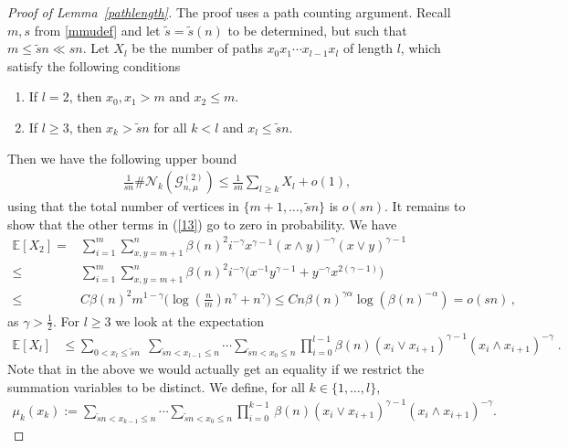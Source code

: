 \documentclass[10pt,a4paper]{amsart}
\begin{document}
\begin{proof}[Proof of Lemma~\ref{pathlength}]
The proof uses a path counting argument. Recall $m, s$ from \eqref{mmudef} %
and let $\tilde s=\tilde s(n)$ to be determined, but such that $m \le \tilde sn \ll sn $.
Let $X_l$ be the number of paths $x_0x_1\cdots x_{l-1}x_l$ of length $l$, which satisfy the following conditions 
\begin{enumerate}
    \item[(a)] If $l=2$, then $x_0,x_1>m$ and $x_2 \le m$.
    \item[(b)] If $l\ge 3$, then $x_k>\tilde sn$ for all $k<l$ and $x_l\le \tilde sn$. 
\end{enumerate}
Then we have the following upper bound 
\begin{align} \label{13}
   \frac{1}{sn}\#\mathcal{N}_k(\mathcal G_{n,\mu}^{(2)}) \le    \frac{1}{sn}\sum_{l\ge k} X_l + o(1),
\end{align}
using that the total number of vertices in $\{m+1,\ldots, \tilde{s}n\}$ is $o(sn)$.
It remains to show that the other terms in (\ref{13}) go to zero in probability. We have
\begin{align*}
    \mathbb{E}[X_2]=&\sum_{i=1}^m \sum_{x,y=m+1}^n \beta(n)^2 i^{-\gamma}x^{\gamma-1}(x\wedge y)^{-\gamma}(x\vee y)^{\gamma-1}
    \\ \le & \sum_{i=1}^m \sum_{x,y=m+1}^n \beta(n)^2 i^{-\gamma}\big(x^{-1}y^{\gamma-1}+y^{-\gamma}x^{2(\gamma-1)}\big)
   \\ \le &  C\beta(n)^2 m^{1-\gamma}\big(\log(\tfrac{n}{m})n^{\gamma}+n^{\gamma}\big)
    \le   C n \beta(n)^{\gamma\alpha}\log(\beta(n)^{-\alpha}) = o(sn)\,,
\end{align*}
as $\gamma>\tfrac12$. 
For $l\ge 3$ we look at the expectation
\begin{align*}
	     \mathbb{E}[X_l]&\le \sum_{0<x_l\le \tilde sn} \; \sum_{\tilde sn<x_{l-1}\le n} \cdots \sum_{\tilde sn<x_{0}\le n} \prod_{i=0}^{l-1} \beta(n)(x_i \vee x_{i+1})^{\gamma-1}(x_i \wedge x_{i+1})^{-\gamma} \; .
	\end{align*}
	Note that in the above we would actually get an equality if we restrict the summation variables to be distinct.
	We define, for all $k\in\{1,\dots,l\}$,
	\begin{align*}
		\mu_k(x_k):=\sum_{\tilde sn<x_{k-1}\le n} \cdots \sum_{\tilde sn<x_{0}\le n} \prod_{i=0}^{k-1} \, \beta(n)(x_i \vee x_{i+1})^{\gamma-1}(x_i \wedge x_{i+1})^{-\gamma}.
	\end{align*}

\end{proof}
\end{document}
